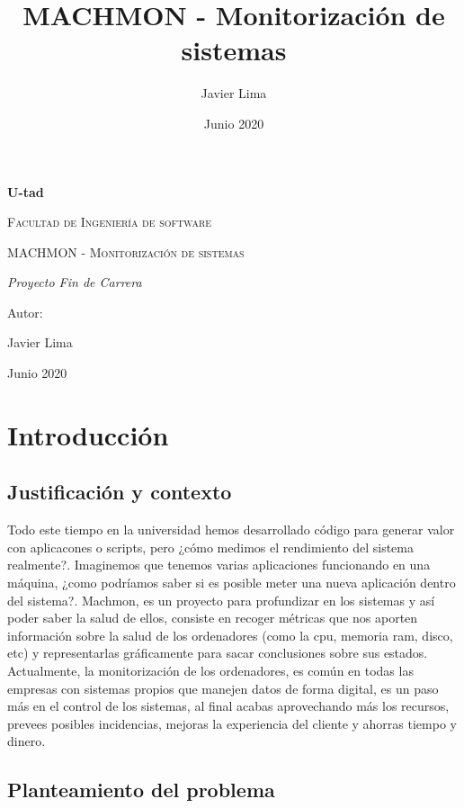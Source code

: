\documentclass[ spanish, a4paper, 12pt, twoside]{report}
\title{\Huge MACHMON - Monitorización de sistemas }
\author{Javier Lima}
\date{Junio 2020}
\begin{document}
\begin{titlepage}
   \centering
   {\bfseries\LARGE U-tad \par}
   \vspace{1cm}
   {\scshape\Large Facultad de Ingeniería de software \par}
   \vspace{3cm}
   {\scshape\Huge MACHMON - Monitorización de sistemas \par}
   \vspace{3cm}
   {\itshape\Large Proyecto Fin de Carrera \par}
   \vfill
   {\Large Autor: \par}
   {\Large Javier Lima \par}
   \vfill
   {\Large Junio 2020 \par}
\end{titlepage}

\tableofcontents{}
\newpage

\chapter{Introducción}

\section{Justificación y contexto}
Todo este tiempo en la universidad hemos desarrollado código para generar valor con aplicacones o scripts, pero ¿cómo medimos 
el rendimiento del sistema realmente?. Imaginemos que tenemos varias aplicaciones funcionando en una máquina, ¿como 
podríamos saber si es posible meter una nueva aplicación dentro del sistema?. Machmon, es un proyecto para profundizar en 
los sistemas y así poder saber la salud de ellos, consiste en recoger métricas que nos aporten información sobre la salud de los
ordenadores (como la cpu, memoria ram, disco, etc) y representarlas gráficamente para sacar conclusiones sobre sus estados. \\

Actualmente, la monitorización de los ordenadores, es común en todas las empresas con sistemas propios que manejen datos de forma 
digital, es un paso más en el control de los sistemas, al final acabas aprovechando más los recursos, prevees posibles incidencias, mejoras la 
experiencia del cliente y ahorras tiempo y dinero. \\

\section{Planteamiento del problema}
\end{document}
